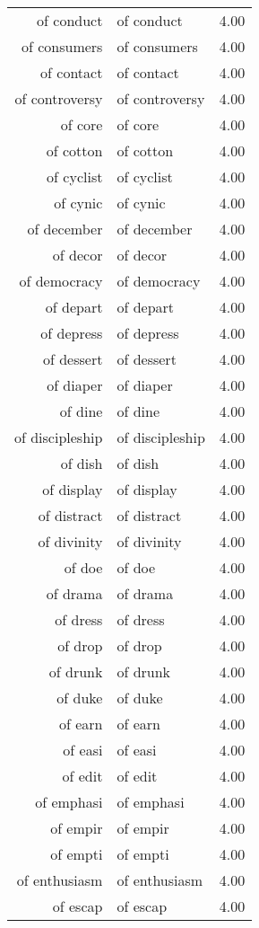 \begin{table}[ht]
\begin{tabular}{rlr}
  of conduct & of conduct & 4.00 \\ 
  of consumers & of consumers & 4.00 \\ 
  of contact & of contact & 4.00 \\ 
  of controversy & of controversy & 4.00 \\ 
  of core & of core & 4.00 \\ 
  of cotton & of cotton & 4.00 \\ 
  of cyclist & of cyclist & 4.00 \\ 
  of cynic & of cynic & 4.00 \\ 
  of december & of december & 4.00 \\ 
  of decor & of decor & 4.00 \\ 
  of democracy & of democracy & 4.00 \\ 
  of depart & of depart & 4.00 \\ 
  of depress & of depress & 4.00 \\ 
  of dessert & of dessert & 4.00 \\ 
  of diaper & of diaper & 4.00 \\ 
  of dine & of dine & 4.00 \\ 
  of discipleship & of discipleship & 4.00 \\ 
  of dish & of dish & 4.00 \\ 
  of display & of display & 4.00 \\ 
  of distract & of distract & 4.00 \\ 
  of divinity & of divinity & 4.00 \\ 
  of doe & of doe & 4.00 \\ 
  of drama & of drama & 4.00 \\ 
  of dress & of dress & 4.00 \\ 
  of drop & of drop & 4.00 \\ 
  of drunk & of drunk & 4.00 \\ 
  of duke & of duke & 4.00 \\ 
  of earn & of earn & 4.00 \\ 
  of easi & of easi & 4.00 \\ 
  of edit & of edit & 4.00 \\ 
  of emphasi & of emphasi & 4.00 \\ 
  of empir & of empir & 4.00 \\ 
  of empti & of empti & 4.00 \\ 
  of enthusiasm & of enthusiasm & 4.00 \\ 
  of escap & of escap & 4.00 \\ 

\end{tabular}
\end{table}
